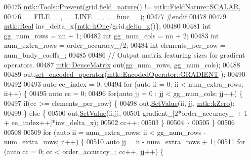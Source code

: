 \begin{DoxyCode}
{{00475   \hyperlink{classmtk_1_1Tools_a332324c6f25e66be9dff48c5987a3b9f}{mtk::Tools::Prevent}(grid.\hyperlink{classmtk_1_1UniStgGrid1D_a6f6a5a23011fe90971ed6b8f5f640cd2}{field\_nature}() != 
      \hyperlink{namespacemtk_ga4c54f2a329cfb4e56213b02a259d19e2a8f3d9a4b6a7b7f2c7afa61ca113d0db9}{mtk::FieldNature::SCALAR},
00476                       \_\_FILE\_\_, \_\_LINE\_\_, \_\_func\_\_);
00477 \textcolor{preprocessor}{  #endif}
00478 
00479   \hyperlink{group__c01-roots_gac080bbbf5cbb5502c9f00405f894857d}{mtk::Real} inv\_delta\_x\{\hyperlink{group__c01-roots_ga26407c24d43b6b95480943340d285c71}{mtk::kOne}/grid.\hyperlink{classmtk_1_1UniStgGrid1D_a6e7173b01241632cf509496d66b9f74c}{delta\_x}()\};
00480 
00481   \textcolor{keywordtype}{int} gg\_num\_rows = nn + 1;
00482   \textcolor{keywordtype}{int} gg\_num\_cols = nn + 2;
00483   \textcolor{keywordtype}{int} num\_extra\_rows = order\_accuracy\_/2;
00484   \textcolor{keywordtype}{int} elements\_per\_row = num\_bndy\_coeffs\_;
00485 
00486   \textcolor{comment}{// Output matrix featuring sizes for gradient operators.}
00487   \hyperlink{classmtk_1_1DenseMatrix}{mtk::DenseMatrix} out(gg\_num\_rows, gg\_num\_cols);
00488 
00489   out.\hyperlink{classmtk_1_1DenseMatrix_ac0f824b0fec88c4fb42e77b7550fb0d3}{set\_encoded\_operator}(\hyperlink{namespacemtk_ga9b50023bfb2692219d2915feade94f80a90f70ea2675c36bd9b0b44a79f37a41f}{mtk::EncodedOperator::GRADIENT}
      );
00490 
00492 
00493   \textcolor{keyword}{auto} ee\_index = 0;
00494   \textcolor{keywordflow}{for} (\textcolor{keyword}{auto} ii = 0; ii < num\_extra\_rows; ii++) \{
00495     \textcolor{keyword}{auto} cc = 0;
00496     \textcolor{keywordflow}{for}(\textcolor{keyword}{auto} jj = 0 ; jj < gg\_num\_cols; jj++) \{
00497       \textcolor{keywordflow}{if}(cc >= elements\_per\_row) \{
00498         out.\hyperlink{classmtk_1_1DenseMatrix_a784ce5784109ac86bfb9d8562b334b13}{SetValue}(ii, jj, \hyperlink{group__c01-roots_ga59a451a5fae30d59649bcda274fea271}{mtk::kZero});
00499       \} \textcolor{keywordflow}{else} \{
00500         out.\hyperlink{classmtk_1_1DenseMatrix_a784ce5784109ac86bfb9d8562b334b13}{SetValue}(ii,jj,
00501                      gradient\_[2*order\_accuracy\_ + 1 + ee\_index++]*inv\_delta\_x);
00502         cc++;
00503       \}
00504     \}
00505   \}
00506 
00508 
00509   \textcolor{keywordflow}{for} (\textcolor{keyword}{auto} ii = num\_extra\_rows; ii < gg\_num\_rows - num\_extra\_rows; ii++) \{
00510     \textcolor{keyword}{auto} jj = ii - num\_extra\_rows + 1;
00511     \textcolor{keywordflow}{for} (\textcolor{keyword}{auto} cc = 0; cc < order\_accuracy\_; cc++, jj++) \{
}}
\end{DoxyCode}
